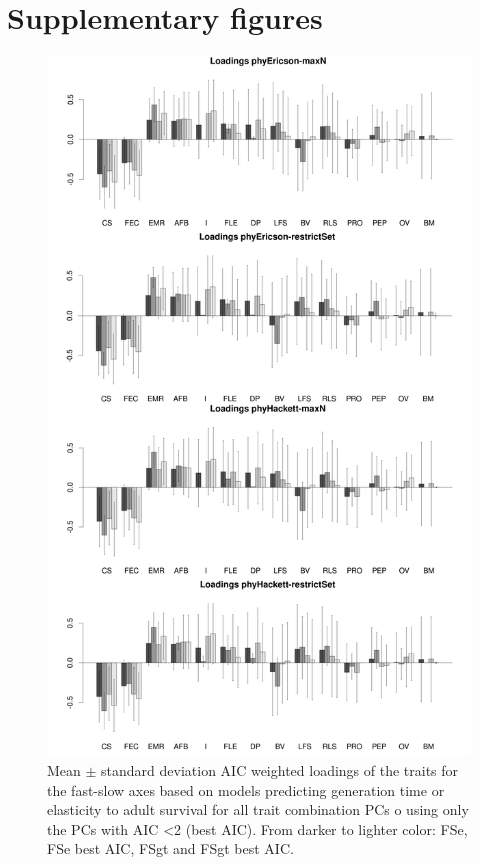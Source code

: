 \clearpage%


\section*{Supplementary figures}

\begin{figure}[ht!]
\centering
\includegraphics[width=.8\textwidth]{./Figures/Appendix2_1/FS loadings plots-ALL.png}
\caption[LHT loadings of the FS axes]{
Mean $\pm$ standard deviation AIC weighted loadings of the traits for the
fast-slow axes based on models predicting generation time or elasticity to
adult survival for all trait combination PCs o using only the PCs with AIC
\textless{2} (best AIC). From darker to lighter color: FSe, FSe best AIC, FSgt
and FSgt best AIC.}
\label{fig:figApp2.1}
\end{figure}

